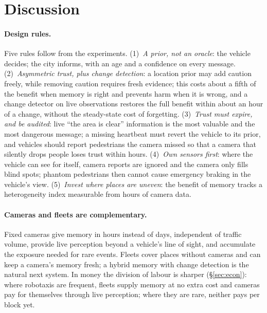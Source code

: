 \documentclass[11pt,a4paper]{article}
\begin{document}
\section{Discussion}
\label{sec:discussion}

\paragraph{Design rules.}
Five rules follow from the experiments.
(1)~\emph{A prior, not an oracle}: the vehicle decides; the city informs, with an age and a confidence on every message.
(2)~\emph{Asymmetric trust, plus change detection}: a location prior may add caution freely, while removing caution requires fresh evidence; this costs about a fifth of the benefit when memory is right and prevents harm when it is wrong, and a change detector on live observations restores the full benefit within about an hour of a change, without the steady-state cost of forgetting.
(3)~\emph{Trust must expire, and be audited}: live ``the area is clear'' information is the most valuable and the most dangerous message; a missing heartbeat must revert the vehicle to its prior, and vehicles should report pedestrians the camera missed so that a camera that silently drops people loses trust within hours.
(4)~\emph{Own sensors first}: where the vehicle can see for itself, camera reports are ignored and the camera only fills blind spots; phantom pedestrians then cannot cause emergency braking in the vehicle's view.
(5)~\emph{Invest where places are uneven}: the benefit of memory tracks a heterogeneity index measurable from hours of camera data.

\paragraph{Cameras and fleets are complementary.}
Fixed cameras give memory in hours instead of days, independent of traffic volume, provide live perception beyond a vehicle's line of sight, and accumulate the exposure needed for rare events. Fleets cover places without cameras and can keep a camera's memory fresh; a hybrid memory with change detection is the natural next system. In money the division of labour is sharper (\S\ref{sec:econ}): where robotaxis are frequent, fleets supply memory at no extra cost and cameras pay for themselves through live perception; where they are rare, neither pays per block yet.
\end{document}
